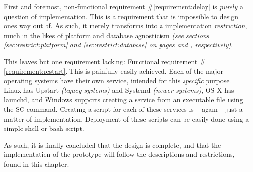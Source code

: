 		First and foremost, non-functional requirement \#\ref{requirement:delay} is \emph{purely} a question of implementation. This is a requirement that is impossible to design ones way out of. As such, it merely transforms into a implementation \emph{restriction}, much in the likes of platform and database agnosticism \emph{(see sections \ref{sec:restrict:platform} and \ref{sec:restrict:database} on pages \pageref{sec:restrict:platform} and \pageref{sec:restrict:database}, respectively)}.

		This leaves but one requirement lacking: Functional requirement \#\ref{requirement:restart}. This is painfully easily achieved. Each of the major operating systems have their own service, intended for this \emph{specific} purpose. Linux has Upstart \emph{(legacy systems)} and Systemd \emph{(newer systems)}\cite{autostart:linux}, OS X has launchd\cite{autostart:osx}, and Windows supports creating a service from an executable file using the SC command\cite{autostart:windows}. Creating a script for each of these services is -- again -- just a matter of implementation. Deployment of these scripts can be easily done using a simple shell or bash script.

		As such, it is finally concluded that the design is complete, and that the implementation of the prototype will follow the descriptions and restrictions, found in this chapter.


